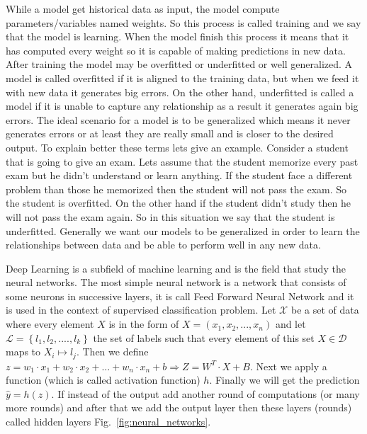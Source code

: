 \documentclass[a4paper,12pt]{report}
\theoremstyle{definitionNODot}
\begin{document}
	While a model get historical data as input, the model compute parameters/variables named weights. So this process is called training and we say that the model is learning. When the model finish this process it means that it has computed every weight so it is capable of making predictions in new data. After training the model may be overfitted or underfitted or well generalized. A model is called overfitted if it is aligned to the training data, but when we feed it with new data it generates big errors. On the other hand, underfitted is called a model if it is unable to capture any relationship as a result it generates again big errors. The ideal scenario for a model is to be generalized which means it never generates errors or at least they are really small and is closer to the desired output. To explain better these terms lets give an example. Consider a student that is going to give an exam. Lets assume that the student memorize every past exam but he didn't understand or learn anything. If the student face a different problem than those he memorized then the student will not pass the exam. So the student is overfitted. On the other hand if the student didn't study then he will not pass the exam again. So in this situation we say that the student is underfitted. Generally we want our models to be generalized in order to learn the relationships between data and be able to perform well in any new data. 
	
	Deep Learning is a subfield of machine learning and is the field that study the neural networks. The most simple neural network is a network that consists of some neurons in successive layers, it is call Feed Forward Neural Network and it is used in the context of supervised classification problem. Let $\mathcal{X}$ be a set of data where every element $X$ is in the form of $X=(x_1,x_2,...,x_n)$ and let $\mathcal{L}=\left \{l_1,l_2,....,l_k \right \}$ the set of labels such that every element of this set $X\in\mathcal{D}$ maps to $X_i \mapsto l_j$. Then we define $z=w_1\cdot x_1 + w_2\cdot x_2 +...+w_n\cdot x_n + b \Rightarrow Z = W^T \cdot X + B$. Next we apply a function (which is called activation function) $h$. Finally we will get the prediction $\hat{y} = h(z)$. If instead of the output add another round of computations (or many more rounds) and after that we add the output layer then these layers (rounds) called hidden layers Fig.~\ref{fig:neural_networks}. 
	
\end{document}
